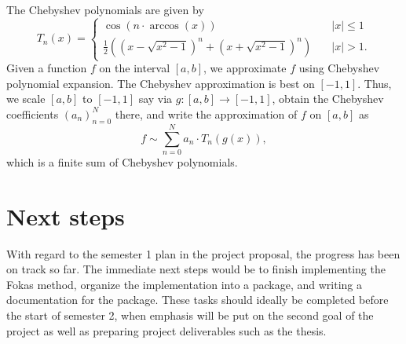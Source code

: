 \documentclass[11pt, oneside, a4paper]{article}
\begin{document}
The Chebyshev polynomials are given by
\[
    T_n(x) =
\begin{cases}
    \cos(n\cdot \arccos(x))&\quad\mbox{$|x|\leq 1$}\\
    \frac{1}{2}\left((x-\sqrt{x^2-1})^n + (x+\sqrt{x^2-1})^n\right)&\quad\mbox{$|x|>1$}.
\end{cases}    
\]
Given a function $f$ on the interval $[a,b]$, we approximate $f$ using Chebyshev polynomial expansion. The Chebyshev approximation is best on $[-1,1]$. Thus, we scale $[a,b]$ to $[-1,1]$ say via $g:[a,b]\to [-1,1]$, obtain the Chebyshev coefficients $(a_n)_{n=0}^N$ there, and write the approximation of $f$ on $[a,b]$ as
\[f\sim \sum_{n=0}^N a_n\cdot T_n(g(x)),\]
which is a finite sum of Chebyshev polynomials.

\section{Next steps}
With regard to the semester 1 plan in the project proposal, the progress has been on track so far. The immediate next steps would be to finish implementing the Fokas method, organize the implementation into a package, and writing a documentation for the package. These tasks should ideally be completed before the start of semester 2, when emphasis will be put on the second goal of the project as well as preparing project deliverables such as the thesis.


\newpage

% 

\end{document}
